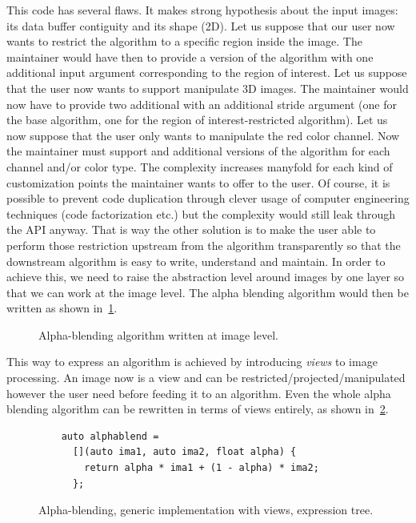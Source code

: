 This code has several flaws. It makes strong hypothesis about the input images: its data buffer contiguity and its shape
(2D). Let us suppose that our user now wants to restrict the algorithm to a specific region inside the image. The
maintainer would have then to provide a version of the algorithm with one additional input argument corresponding to the
region of interest. Let us suppose that the user now wants to support manipulate 3D images. The maintainer would now
have to provide two additional with an additional stride argument (one for the base algorithm, one for the region of
interest-restricted algorithm). Let us now suppose that the user only wants to manipulate the red color channel. Now the
maintainer must support and additional versions of the algorithm for each channel and/or color type. The complexity
increases manyfold for each kind of customization points the maintainer wants to offer to the user. Of course, it is
possible to prevent code duplication through clever usage of computer engineering techniques (code factorization etc.)
but the complexity would still leak through the API anyway. That is way the other solution is to make the user able to
perform those restriction upstream from the algorithm transparently so that the downstream algorithm is easy to write,
understand and maintain. In order to achieve this, we need to raise the abstraction level around images by one layer so
that we can work at the image level. The alpha blending algorithm would then be written as shown
in~\cref{fig.view.alphablend}.

\begin{figure}[htbp]
  \centering
  

  \caption{Alpha-blending algorithm written at image level.}
  \label{fig.view.alphablend}
\end{figure}

This way to express an algorithm is achieved by introducing \emph{views} to image processing. An image now is a view and
can be restricted/projected/manipulated however the user need before feeding it to an algorithm. Even the whole alpha
blending algorithm can be rewritten in terms of views entirely, as shown in~\cref{fig.new.alphablend}.

\begin{figure}[htbp]
  \centering
  \begin{minipage}[b]{5.5cm}
    
  \end{minipage}
  \begin{minipage}[b]{5.5cm}
    \begin{verbatim}
    auto alphablend =
      [](auto ima1, auto ima2, float alpha) {
        return alpha * ima1 + (1 - alpha) * ima2;
      };
    \end{verbatim}
    \bigskip
    \bigskip
    \bigskip
  \end{minipage}
  \caption{Alpha-blending, generic implementation with views, expression tree.}
  \label{fig.new.alphablend}
\end{figure}

